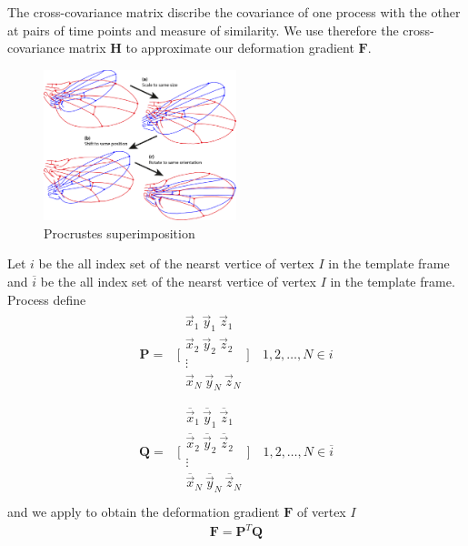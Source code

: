\documentclass{beamer}
\begin{document}

\begin{frame}
The cross-covariance matrix discribe the covariance of one process with the other at pairs of time points and measure of similarity. We use therefore the cross-covariance matrix $\mathbf{H}$ to approximate our deformation gradient $\mathbf{F}$.
\begin{figure}
\centering
\includegraphics[width=0.5\textwidth]{image//Procrustes_superimposition.png}
\caption{Procrustes superimposition}
\end{figure}
\end{frame}


\begin{frame}
Let $i$ be the all index set of the nearst vertice of vertex $I$ in the template frame and $\overline{i}$ be the all index set of the nearst vertice of vertex $I$ in the template frame. Process define
\begin{align}
\mathbf{P}=&\bigg[\begin{matrix}
   \vec{x}_1 \ \vec{y}_1 \ \vec{z}_1\\
   \vec{x}_2 \ \vec{y}_2 \ \vec{z}_2 \\
   \vdots 	\\   
   \vec{x}_N \ \vec{y}_N \ \vec{z}_N \\
\end{matrix}\biggr] \quad 1,2,\dots,N \in i 
\end{align}
\begin{align}
\mathbf{Q}=&\bigg[\begin{matrix}
   \overline{\vec{x}}_1 \ \overline{\vec{y}}_1 \ \overline{\vec{z}}_1\\
   \overline{\vec{x}}_2 \ \overline{\vec{y}}_2 \ \overline{\vec{z}}_2\\
   \vdots 	\\
   \overline{\vec{x}}_N \ \overline{\vec{y}}_N \ \overline{\vec{z}}_N\\
\end{matrix}\biggr] \quad 1,2,\dots,N \in \overline{i} 
\end{align} 
and we apply to obtain the deformation gradient $\mathbf{F}$ of vertex $I$
\begin{align}
\mathbf{F} =\mathbf{P}^T \mathbf{Q}
\end{align}
\end{frame}
\end{document}
